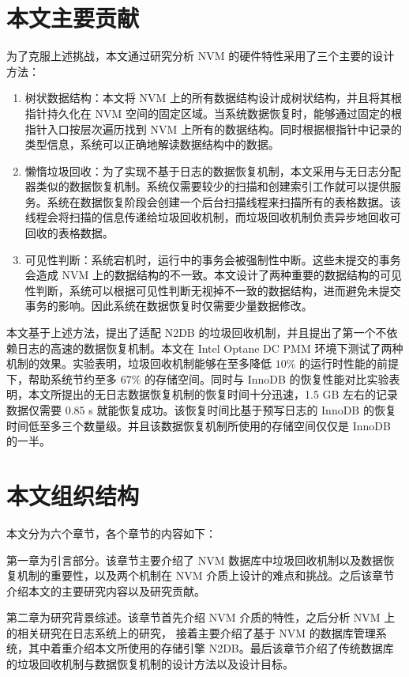 \section{本文主要贡献}

为了克服上述挑战，本文通过研究分析 NVM 的硬件特性采用了三个主要的设计方法：

\begin{enumerate}
    \item 树状数据结构：本文将 NVM 上的所有数据结构设计成树状结构，并且将其根指针持久化在 NVM 空间的固定区域。当系统数据恢复时，能够通过固定的根指针入口按层次遍历找到 NVM 上所有的数据结构。同时根据根指针中记录的类型信息，系统可以正确地解读数据结构中的数据。
    \item 懒惰垃圾回收：为了实现不基于日志的数据恢复机制，本文采用与无日志分配器类似的数据恢复机制。系统仅需要较少的扫描和创建索引工作就可以提供服务。系统在数据恢复阶段会创建一个后台扫描线程来扫描所有的表格数据。该线程会将扫描的信息传递给垃圾回收机制，而垃圾回收机制负责异步地回收可回收的表格数据。
    \item 可见性判断：系统宕机时，运行中的事务会被强制性中断。这些未提交的事务会造成 NVM 上的数据结构的不一致。本文设计了两种重要的数据结构的可见性判断，系统可以根据可见性判断无视掉不一致的数据结构，进而避免未提交事务的影响。因此系统在数据恢复时仅需要少量数据修改。
\end{enumerate}

本文基于上述方法，提出了适配 N2DB 的垃圾回收机制，并且提出了第一个不依赖日志的高速的数据恢复机制。本文在 Intel Optane DC PMM 环境下测试了两种机制的效果。实验表明，垃圾回收机制能够在至多降低 $10\%$ 的运行时性能的前提下，帮助系统节约至多 $67\%$ 的存储空间。同时与 InnoDB 的恢复性能对比实验表明，本文所提出的无日志数据恢复机制的恢复时间十分迅速，1.5 GB 左右的记录数据仅需要 0.85 s 就能恢复成功。该恢复时间比基于预写日志的 InnoDB 的恢复时间低至多三个数量级。并且该数据恢复机制所使用的存储空间仅仅是 InnoDB 的一半。

\section{本文组织结构}

本文分为六个章节，各个章节的内容如下：

第一章为引言部分。该章节主要介绍了 NVM 数据库中垃圾回收机制以及数据恢复机制的重要性，以及两个机制在 NVM 介质上设计的难点和挑战。之后该章节介绍本文的主要研究内容以及研究贡献。

第二章为研究背景综述。该章节首先介绍 NVM 介质的特性，之后分析 NVM 上的相关研究在日志系统上的研究，
接着主要介绍了基于 NVM 的数据库管理系统，其中着重介绍本文所使用的存储引擎 N2DB。最后该章节介绍了传统数据库的垃圾回收机制与数据恢复机制的设计方法以及设计目标。

